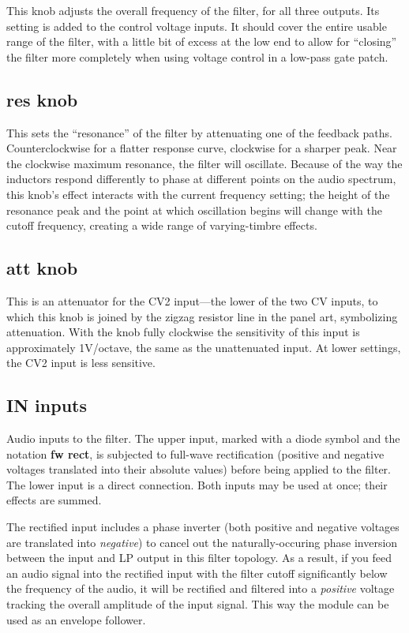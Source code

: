 This knob adjusts the overall frequency of the filter, for all three
outputs.  Its setting is added to the control voltage inputs.  It should
cover the entire usable range of the filter, with a little bit of excess at
the low end to allow for ``closing'' the filter more completely when using
voltage control in a low-pass gate patch.

\subsection{res knob}

This sets the ``resonance'' of the filter by attenuating one of the feedback
paths.  Counterclockwise for a flatter response curve, clockwise for a
sharper peak.  Near the clockwise maximum resonance, the filter will
oscillate.  Because of the way the inductors respond differently to phase at
different points on the audio spectrum, this knob's effect interacts with
the current frequency setting; the height of the resonance peak and the
point at which oscillation begins will change with the cutoff frequency,
creating a wide range of varying-timbre effects.

\subsection{att knob}

This is an attenuator for the CV2 input---the lower of the two CV inputs, to
which this knob is joined by the zigzag resistor line in the panel art,
symbolizing attenuation.  With the knob fully clockwise the sensitivity of
this input is approximately 1V/octave, the same as the unattenuated input. 
At lower settings, the CV2 input is less sensitive.

\subsection{IN inputs}

Audio inputs to the filter.  The upper input, marked with a diode symbol and
the notation \textbf{fw rect}, is subjected to full-wave rectification
(positive and negative voltages translated into their absolute values)
before being applied to the filter.  The lower input is a direct connection. 
Both inputs may be used at once; their effects are summed.

The rectified input includes a phase inverter (both positive and negative
voltages are translated into \emph{negative}) to cancel out the
naturally-occuring phase inversion between the
input and LP output in this filter topology.  As a result, if you feed an
audio signal into the rectified input with the filter cutoff significantly
below the frequency of the audio, it will be rectified and filtered into a
\emph{positive} voltage tracking the overall amplitude of the input signal. 
This way the module can be used as an envelope follower.

